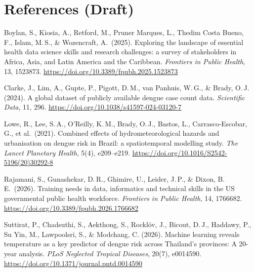 \documentclass[11pt,a4paper]{article}
\begin{document}
\section*{References (Draft)}
\begin{small}
\begin{description}[nosep,leftmargin=1em,labelindent=0pt]
\item Boylan, S., Kiosia, A., Retford, M., Pruner Marques, L., Thedim Costa Bueno, F.,
  Islam, M.\,S., \& Wozencraft, A.\ (2025). Exploring the landscape of essential
  health data science skills and research challenges: a survey of stakeholders in
  Africa, Asia, and Latin America and the Caribbean. \emph{Frontiers in Public
  Health}, 13, 1523873. \url{https://doi.org/10.3389/fpubh.2025.1523873}
\item Clarke, J., Lim, A., Gupte, P., Pigott, D.\,M., van Panhuis, W.\,G., \&
  Brady, O.\,J. (2024). A global dataset of publicly available dengue case count
  data. \emph{Scientific Data}, 11, 296.
  \url{https://doi.org/10.1038/s41597-024-03120-7}
\item Lowe, R., Lee, S.\,A., O'Reilly, K.\,M., Brady, O.\,J., Bastos, L.,
  Carrasco-Escobar, G., et al.\ (2021). Combined effects of hydrometeorological
  hazards and urbanisation on dengue risk in Brazil: a spatiotemporal modelling
  study. \emph{The Lancet Planetary Health}, 5(4), e209--e219.
  \url{https://doi.org/10.1016/S2542-5196(20)30292-8}
\item Rajamani, S., Gunashekar, D.\,R., Ghimire, U., Leider, J.\,P., \& Dixon, B.\,E.\
  (2026). Training needs in data, informatics and technical skills in the US
  governmental public health workforce. \emph{Frontiers in Public Health}, 14,
  1766682. \url{https://doi.org/10.3389/fpubh.2026.1766682}
\item Suttirat, P., Chadsuthi, S., Aekthong, S., Rocklöv, J., Bicout, D.\,J.,
  Haddawy, P., Su Yin, M., Lawpoolsri, S., \& Modchang, C. (2026). Machine
  learning reveals temperature as a key predictor of dengue risk across
  Thailand's provinces: A 20-year analysis. \emph{PLoS Neglected Tropical
  Diseases}, 20(7), e0014590.
  \url{https://doi.org/10.1371/journal.pntd.0014590}
\end{description}
\end{small}
\end{document}
